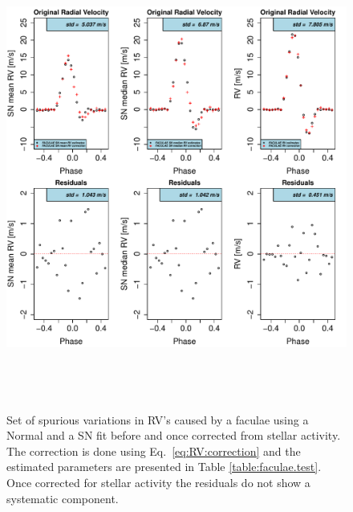 \documentclass[11pt, oneside]{article}
\begin{document}
\begin{figure}[htbp]
   \centering
\includegraphics[height = 6in]{FACULAE_NEW_CORRECTION_[3]CorrectionActivity_RadialVelocity_vs_time.pdf} 
   \caption{Set of spurious variations in RV's caused by a faculae using a Normal and a SN fit before and once corrected from stellar activity. The correction is done using Eq.~\ref{eq:RV:correction} and the estimated parameters are presented in Table \ref{table:faculae.test}. Once corrected for stellar activity the residuals do not show a systematic component.}
    \label{fig:faculae.correction}
\end{figure}
\end{document}
